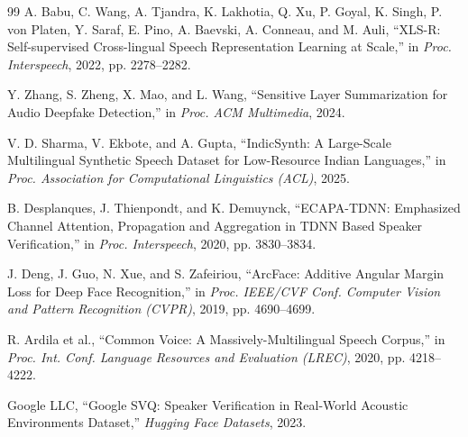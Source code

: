 \documentclass[11pt,a4paper]{article}
\begin{document}
\begin{thebibliography}{99}
A. Babu, C. Wang, A. Tjandra, K. Lakhotia, Q. Xu, P. Goyal, K. Singh, P. von Platen, Y. Saraf, E. Pino, A. Baevski, A. Conneau, and M. Auli, ``XLS-R: Self-supervised Cross-lingual Speech Representation Learning at Scale,'' in \textit{Proc. Interspeech}, 2022, pp. 2278--2282.

Y. Zhang, S. Zheng, X. Mao, and L. Wang, ``Sensitive Layer Summarization for Audio Deepfake Detection,'' in \textit{Proc. ACM Multimedia}, 2024.

V. D. Sharma, V. Ekbote, and A. Gupta, ``IndicSynth: A Large-Scale Multilingual Synthetic Speech Dataset for Low-Resource Indian Languages,'' in \textit{Proc. Association for Computational Linguistics (ACL)}, 2025.

B. Desplanques, J. Thienpondt, and K. Demuynck, ``ECAPA-TDNN: Emphasized Channel Attention, Propagation and Aggregation in TDNN Based Speaker Verification,'' in \textit{Proc. Interspeech}, 2020, pp. 3830--3834.

J. Deng, J. Guo, N. Xue, and S. Zafeiriou, ``ArcFace: Additive Angular Margin Loss for Deep Face Recognition,'' in \textit{Proc. IEEE/CVF Conf. Computer Vision and Pattern Recognition (CVPR)}, 2019, pp. 4690--4699.

R. Ardila et al., ``Common Voice: A Massively-Multilingual Speech Corpus,'' in \textit{Proc. Int. Conf. Language Resources and Evaluation (LREC)}, 2020, pp. 4218--4222.

Google LLC, ``Google SVQ: Speaker Verification in Real-World Acoustic Environments Dataset,'' \textit{Hugging Face Datasets}, 2023.
\end{thebibliography}
\end{document}
